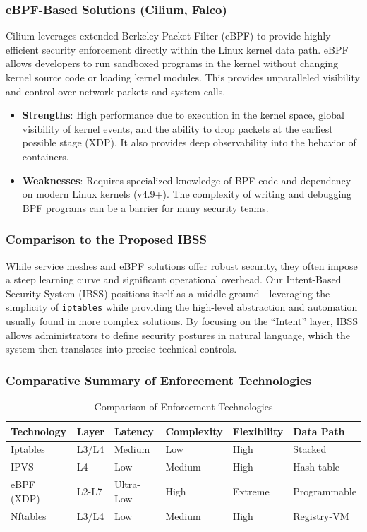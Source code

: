 \documentclass[12pt,a4paper]{article}
\begin{document}
\subsubsection{eBPF-Based Solutions (Cilium, Falco)}
Cilium leverages extended Berkeley Packet Filter (eBPF) to provide highly efficient security enforcement directly within the Linux kernel data path. eBPF allows developers to run sandboxed programs in the kernel without changing kernel source code or loading kernel modules. This provides unparalleled visibility and control over network packets and system calls.
\begin{itemize}
    \item \textbf{Strengths}: High performance due to execution in the kernel space, global visibility of kernel events, and the ability to drop packets at the earliest possible stage (XDP). It also provides deep observability into the behavior of containers.
    \item \textbf{Weaknesses}: Requires specialized knowledge of BPF code and dependency on modern Linux kernels (v4.9+). The complexity of writing and debugging BPF programs can be a barrier for many security teams.
\end{itemize}

\subsubsection{Comparison to the Proposed IBSS}
While service meshes and eBPF solutions offer robust security, they often impose a steep learning curve and significant operational overhead. Our Intent-Based Security System (IBSS) positions itself as a middle ground—leveraging the simplicity of \texttt{iptables} while providing the high-level abstraction and automation usually found in more complex solutions. By focusing on the ``Intent'' layer, IBSS allows administrators to define security postures in natural language, which the system then translates into precise technical controls.

\subsubsection{Comparative Summary of Enforcement Technologies}
\begin{table}[h]
\centering
\caption{Comparison of Enforcement Technologies}
\begin{tabularx}{\textwidth}{@{} X l l l l l @{}}
\toprule
\textbf{Technology} & \textbf{Layer} & \textbf{Latency} & \textbf{Complexity} & \textbf{Flexibility} & \textbf{Data Path} \\ \midrule
Iptables & L3/L4 & Medium & Low & High & Stacked \\
IPVS & L4 & Low & Medium & High & Hash-table \\
eBPF (XDP) & L2-L7 & Ultra-Low & High & Extreme & Programmable \\
Nftables & L3/L4 & Low & Medium & High & Registry-VM \\ \bottomrule
\end{tabularx}
\end{table}
\end{document}
